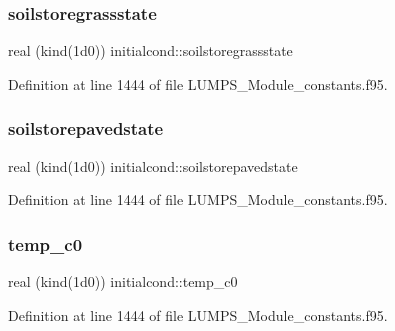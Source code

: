 \subsubsection{\texorpdfstring{soilstoregrassstate}{soilstoregrassstate}}
{\footnotesize\ttfamily real (kind(1d0)) initialcond\+::soilstoregrassstate}



Definition at line 1444 of file L\+U\+M\+P\+S\+\_\+\+Module\+\_\+constants.\+f95.

\mbox{\label{namespaceinitialcond_aeefca775739fc6fb0d57b02d5ba9c49f}} 
\subsubsection{\texorpdfstring{soilstorepavedstate}{soilstorepavedstate}}
{\footnotesize\ttfamily real (kind(1d0)) initialcond\+::soilstorepavedstate}



Definition at line 1444 of file L\+U\+M\+P\+S\+\_\+\+Module\+\_\+constants.\+f95.

\mbox{\label{namespaceinitialcond_a61adf7674cde4a05c39ceaaecac23076}} 
\subsubsection{\texorpdfstring{temp\+\_\+c0}{temp\_c0}}
{\footnotesize\ttfamily real (kind(1d0)) initialcond\+::temp\+\_\+c0}



Definition at line 1444 of file L\+U\+M\+P\+S\+\_\+\+Module\+\_\+constants.\+f95.

